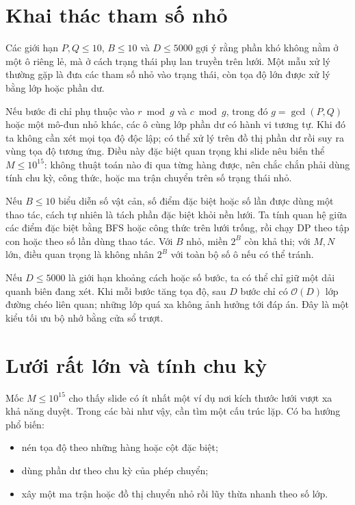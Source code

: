 \documentclass[11pt]{article}
\newcommand{\Oh}{\mathcal{O}}
\begin{document}
\section{Khai thác tham số nhỏ}

Các giới hạn \(P,Q\le 10\), \(B\le 10\) và \(D\le 5000\) gợi ý rằng phần khó
không nằm ở một ô riêng lẻ, mà ở cách trạng thái phụ lan truyền trên lưới.
Một mẫu xử lý thường gặp là đưa các tham số nhỏ vào trạng thái, còn tọa độ lớn
được xử lý bằng lớp hoặc phần dư.

Nếu bước đi chỉ phụ thuộc vào \(r\bmod g\) và \(c\bmod g\), trong đó
\(g=\gcd(P,Q)\) hoặc một mô-đun nhỏ khác, các ô cùng lớp phần dư có hành vi
tương tự. Khi đó ta không cần xét mọi tọa độ độc lập; có thể xử lý trên đồ thị
phần dư rồi suy ra vùng tọa độ tương ứng. Điều này đặc biệt quan trọng khi
slide nêu biến thể \(M\le 10^{15}\): không thuật toán nào đi qua từng hàng
được, nên chắc chắn phải dùng tính chu kỳ, công thức, hoặc ma trận chuyển
trên số trạng thái nhỏ.

Nếu \(B\le 10\) biểu diễn số vật cản, số điểm đặc biệt hoặc số lần được dùng
một thao tác, cách tự nhiên là tách phần đặc biệt khỏi nền lưới. Ta tính quan
hệ giữa các điểm đặc biệt bằng BFS hoặc công thức trên lưới trống, rồi chạy
DP theo tập con hoặc theo số lần dùng thao tác. Với \(B\) nhỏ, miền \(2^B\)
còn khả thi; với \(M,N\) lớn, điều quan trọng là không nhân \(2^B\) với toàn
bộ số ô nếu có thể tránh.

Nếu \(D\le 5000\) là giới hạn khoảng cách hoặc số bước, ta có thể chỉ giữ một
dải quanh biên đang xét. Khi mỗi bước tăng tọa độ, sau \(D\) bước chỉ có
\(\Oh(D)\) lớp đường chéo liên quan; những lớp quá xa không ảnh hưởng tới đáp
án. Đây là một kiểu tối ưu bộ nhớ bằng cửa sổ trượt.

\section{Lưới rất lớn và tính chu kỳ}

Mốc \(M\le 10^{15}\) cho thấy slide có ít nhất một ví dụ nơi kích thước lưới
vượt xa khả năng duyệt. Trong các bài như vậy, cần tìm một cấu trúc lặp. Có
ba hướng phổ biến:
\begin{itemize}
  \item nén tọa độ theo những hàng hoặc cột đặc biệt;
  \item dùng phần dư theo chu kỳ của phép chuyển;
  \item xây một ma trận hoặc đồ thị chuyển nhỏ rồi lũy thừa nhanh theo số lớp.
\end{itemize}
\end{document}
